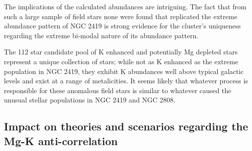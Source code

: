 \documentclass[a4paper,fleqn,usenatbib]{mnras}
\begin{document}
The implications of the calculated abundances are intriguing. The fact that from such a large sample of field stars none were found that replicated the extreme abundance pattern of NGC 2419 is strong evidence for the cluster's uniqueness regarding the extreme bi-modal nature of its abundance pattern.

The 112 star candidate pool of K enhanced and potentially Mg depleted stars represent a unique collection of stars; while not as K enhanced as the extreme population in NGC 2419, they exhibit K abundances well above typical galactic levels and exist at a range of metalicities. It seems likely that whatever process is responsible for these anomalous field stars is similar to whatever caused the unusual stellar populations in NGC 2419 and NGC 2808.

\subsection{Impact on theories and scenarios regarding the Mg-K anti-correlation}
\end{document}
